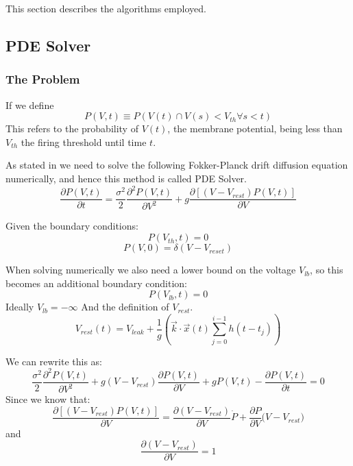 \documentclass[10pt]{article}
\begin{document}
This section describes the algorithms employed.

\subsection{PDE Solver}

\subsubsection{The Problem}
If we define 
\begin{equation}
    P(V,t) \equiv P(V(t) \cap  V(s) < V_{th} \forall s < t)
\end{equation}
This refers to the probability of $V(t)$, the membrane potential,
being less than $V_{th}$ the firing threshold until time $t$.  

As stated in \cite{PaninskiPillowSimoncelli} we need to solve the
following Fokker-Planck drift diffusion equation numerically, and
hence this method is called PDE Solver.
\begin{equation}
    \frac{\partial P(V,t)}{\partial t} =
    \frac{\sigma^2}{2} \frac{\partial^2 P(V,t) } {\partial V^2} +
    g\frac{\partial[(V-V_{rest})P(V,t)]}{\partial V}
\end{equation}

Given the boundary conditions:
\begin{equation}
    P(V_{th},t) = 0
\end{equation}
\begin{equation}
    P(V,0) = \delta(V-V_{reset})
\end{equation}

When solving numerically we also need a lower bound on the
voltage $V_{lb}$, so this becomes an additional boundary condition:
\begin{equation}
    P(V_{lb},t) = 0 
\end{equation}
Ideally $V_{lb} = -\infty $
And the definition of $V_{rest}$.
\begin{equation}
    V_{rest}(t) = V_{leak} + \frac{1}{g}(\vec{k} \cdot \vec{x}(t)
    \sum_{j=0}^{i-1}h(t-t_j))
\end{equation}


We can rewrite this as:
\begin{equation}
    \frac{\sigma^2}{2} \frac{\partial^2 P(V,t) } {\partial V^2} +
    g(V-V_{rest})\frac{\partial P(V,t)}{\partial V} +
    gP(V,t) -
    \frac{\partial P(V,t)}{\partial t} = 
    0
\end{equation}
Since we know that:
\begin{equation}
    \frac{\partial[(V-V_{rest})P(V,t)]}{\partial V} =
    \frac{\partial (V-V_{rest})}{\partial V} \dot P +
    \frac{\partial P}{\partial V} \dot (V-V_{rest})
\end{equation}
and
\begin{equation}
    \frac{\partial (V-V_{rest})}{\partial V} = 1
\end{equation}
\end{document}
